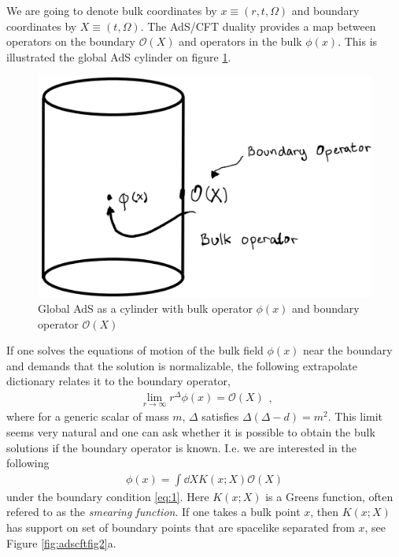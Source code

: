 \documentclass[letter,12pt]{article}
\newcommand{\BO}{\mathcal{O}}
\newcommand{\OO}{\mathcal{O}}
\begin{document}
We are going to denote bulk coordinates by $x\equiv (r,t,\Omega)$ and boundary coordinates by $X\equiv (t,\Omega)$. The AdS/CFT duality provides a map between operators on the boundary $\OO(X)$ and operators in the bulk $\phi(x)$. This is illustrated the global AdS cylinder on figure \ref{fig:adscftfig1}.
\begin{figure}[]
	\centering
	\includegraphics[width=0.6\linewidth]{ADS_CFT_Fig1}
	\caption{Global AdS as a cylinder with bulk operator $\phi(x)$ and boundary operator $\OO(X)$}
	\label{fig:adscftfig1}
\end{figure}
If one solves the equations of motion of the bulk field $\phi(x)$ near the boundary and demands that the solution is normalizable, the following extrapolate dictionary relates it to the boundary operator,
\begin{equation}
	\begin{aligned}
		\lim_{r\to \infty}r^{\Delta}\phi(x)=\BO(X)	\end{aligned}, \label{eq:1}
\end{equation}
where for a generic scalar of mass $m$, $\Delta$ satisfies $\Delta(\Delta-d)=m^2$. This limit seems very natural and one can ask whether it is possible to obtain the bulk solutions if the boundary operator is known. I.e. we are interested in the following 
\begin{equation}
	\begin{aligned}
		\phi(x)=\int\dd X K(x;X)\BO(X) \label{eq:2}
	\end{aligned}
\end{equation}
under the boundary condition \eqref{eq:1}. Here $ K(x;X)$ is a Greens function, often refered to as the \textit{smearing function}. If one takes a bulk point $x$, then $K(x;X)$ has support on set of boundary points that are spacelike separated from $x$, see Figure \ref{fig:adscftfig2}a. 
\end{document}
